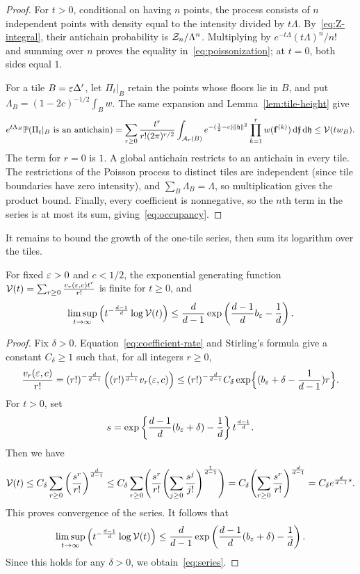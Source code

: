\documentclass[11pt,letterpaper]{article}
\begin{document}
\begin{proof}
      For $t>0$, conditional on having $n$ points, the process consists of $n$ independent points with density equal to the intensity divided by $t\Lambda$. By~\eqref{eq:Z-integral}, their antichain probability is $\mathcal Z_n/\Lambda^n$. Multiplying by $e^{-t\Lambda}(t\Lambda)^n/n!$ and summing over $n$ proves the equality in~\eqref{eq:poissonization}; at $t=0$, both sides equal $1$.

      For a tile $B=\varepsilon\Delta'$, let $\Pi_t|_B$ retain the points whose floors lie in $B$, and put $\Lambda_B=(1-2c)^{-1/2}\int_Bw$. The same expansion and Lemma~\ref{lem:tile-height} give
      \[
            e^{t\Lambda_B}\mathbb P(\Pi_t|_B\text{ is an antichain})
            =\sum_{r\ge0}\frac{t^r}{r!(2\pi)^{r/2}}
            \int_{\mathcal A_r(B)}e^{-(\frac12-c)\|\mathfrak h\|^2}
            \prod_{k=1}^rw(\mathbf f^{(k)})\,\mathrm d\bm{\mathfrak f}\,\mathrm d\mathfrak h
            \le\mathcal V(tw_B).
      \]
      The term for $r=0$ is $1$. A global antichain restricts to an antichain in every tile. The restrictions of the Poisson process to distinct tiles are independent (since tile boundaries have zero intensity), and $\sum_B\Lambda_B=\Lambda$, so multiplication gives the product bound.
      Finally, every coefficient is nonnegative, so the $n$th term in the series is at most its sum, giving~\eqref{eq:occupancy}.
\end{proof}

It remains to bound the growth of the one-tile series, then sum its logarithm over the tiles.

\begin{lemma}\label{lem:series}
      For fixed $\varepsilon>0$ and $c<1/2$, the exponential generating function $\mathcal V(t)=\sum_{r\ge0}\frac{v_r(\varepsilon,c)t^r}{r!}$ is finite for $t\ge0$, and
      \begin{equation}\label{eq:series}
            \limsup_{t\to\infty}\left(t^{-\frac{d-1}{d}} \log \mathcal V(t)\right) \le\frac d{d-1}\exp\left(\frac{d-1}{d}b_\varepsilon-\frac1d\right).
      \end{equation}
\end{lemma}
\begin{proof}
      Fix $\delta>0$. Equation~\eqref{eq:coefficient-rate} and Stirling's formula give a constant $C_\delta\ge1$ such that, for all integers $r\ge0$,
      \[
            \frac{v_r(\varepsilon,c)}{r!} = (r!)^{-\frac d{d-1}} \left((r!)^{\frac{1}{d-1}}v_r(\varepsilon,c)\right) \le  (r!)^{-\frac d{d-1}} C_\delta\exp\Bigl\{(b_\varepsilon+\delta-\frac1{d-1})r\Bigr\}.
      \]
      For $t>0$, set
      \[
            s=\exp\left\{\frac{d-1}{d}(b_\varepsilon+\delta)-\frac1d\right\} t^{\frac{d-1}{d}}.
      \]
      Then we have
      \[
            \mathcal V(t) \le C_\delta\sum_{r\ge0}\left(\frac{s^r}{r!}\right)^{\frac d{d-1}}
            \le C_\delta\sum_{r\ge0}\Biggl(\frac{s^r}{r!}\Biggl(\sum_{j\ge0}\frac{s^j}{j!}\Biggr)^{\frac 1{d-1}}\Biggr)
            = C_\delta\Biggl(\sum_{r\ge0}\frac{s^r}{r!}\Biggr)^{\frac d{d-1}}
            =C_\delta e^{\frac d{d-1}s}.
      \]
      This proves convergence of the series. It follows that
      \[\limsup_{t\to\infty}\left(t^{-\frac{d-1}{d}} \log \mathcal V(t)\right) \le\frac d{d-1}\exp\left(\frac{d-1}{d}(b_\varepsilon+\delta)-\frac1d\right).\]
      Since this holds for any $\delta>0$, we obtain~\eqref{eq:series}.
\end{proof}
\end{document}
